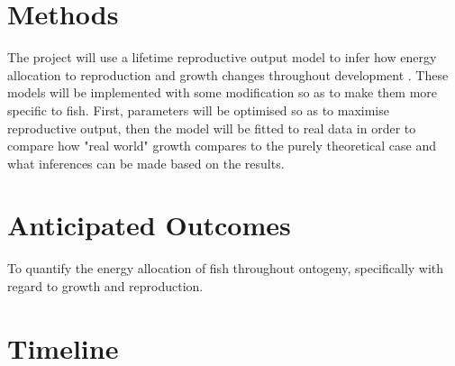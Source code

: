 \section*{Methods}
The project will use a lifetime reproductive output model \citep{Charnov2001} to infer how energy allocation to reproduction and growth changes throughout development \citep{West2001}.  These models will be implemented with some modification so as to make them more specific to fish. First, parameters will be optimised so as to maximise reproductive output, then the model will be fitted to real data in order to compare how "real world" growth compares to the purely theoretical case and what inferences can be made based on the results.
\section*{Anticipated Outcomes}
To quantify the energy allocation of fish throughout ontogeny, specifically with regard to growth and reproduction.
\section*{Timeline}


